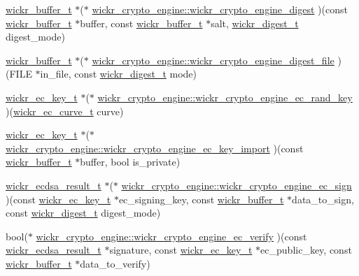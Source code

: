\begin{DoxyCompactItemize}
\item 
\hyperlink{structwickr__buffer}{wickr\+\_\+buffer\+\_\+t} $\ast$($\ast$ \hyperlink{group__wickr__crypto__engine_ga42dfc5b4df166616d962ee4c792ceaf4}{wickr\+\_\+crypto\+\_\+engine\+::wickr\+\_\+crypto\+\_\+engine\+\_\+digest} )(const \hyperlink{structwickr__buffer}{wickr\+\_\+buffer\+\_\+t} $\ast$buffer, const \hyperlink{structwickr__buffer}{wickr\+\_\+buffer\+\_\+t} $\ast$salt, \hyperlink{structwickr__digest}{wickr\+\_\+digest\+\_\+t} digest\+\_\+mode)
\item 
\hyperlink{structwickr__buffer}{wickr\+\_\+buffer\+\_\+t} $\ast$($\ast$ \hyperlink{group__wickr__crypto__engine_ga298d2dea6722151c11e04458d3924823}{wickr\+\_\+crypto\+\_\+engine\+::wickr\+\_\+crypto\+\_\+engine\+\_\+digest\+\_\+file} )(F\+I\+LE $\ast$in\+\_\+file, const \hyperlink{structwickr__digest}{wickr\+\_\+digest\+\_\+t} mode)
\item 
\hyperlink{structwickr__ec__key}{wickr\+\_\+ec\+\_\+key\+\_\+t} $\ast$($\ast$ \hyperlink{group__wickr__crypto__engine_gad16b229b7d16cf00d3983c277ee3b88b}{wickr\+\_\+crypto\+\_\+engine\+::wickr\+\_\+crypto\+\_\+engine\+\_\+ec\+\_\+rand\+\_\+key} )(\hyperlink{structwickr__ec__curve}{wickr\+\_\+ec\+\_\+curve\+\_\+t} curve)
\item 
\hyperlink{structwickr__ec__key}{wickr\+\_\+ec\+\_\+key\+\_\+t} $\ast$($\ast$ \hyperlink{group__wickr__crypto__engine_ga87a069bbd3cdf509946e4ca0ca008f8f}{wickr\+\_\+crypto\+\_\+engine\+::wickr\+\_\+crypto\+\_\+engine\+\_\+ec\+\_\+key\+\_\+import} )(const \hyperlink{structwickr__buffer}{wickr\+\_\+buffer\+\_\+t} $\ast$buffer, bool is\+\_\+private)
\item 
\hyperlink{structwickr__ecdsa__result}{wickr\+\_\+ecdsa\+\_\+result\+\_\+t} $\ast$($\ast$ \hyperlink{group__wickr__crypto__engine_gac5a36d2a53e06a75a2b818e6a5cc96a1}{wickr\+\_\+crypto\+\_\+engine\+::wickr\+\_\+crypto\+\_\+engine\+\_\+ec\+\_\+sign} )(const \hyperlink{structwickr__ec__key}{wickr\+\_\+ec\+\_\+key\+\_\+t} $\ast$ec\+\_\+signing\+\_\+key, const \hyperlink{structwickr__buffer}{wickr\+\_\+buffer\+\_\+t} $\ast$data\+\_\+to\+\_\+sign, const \hyperlink{structwickr__digest}{wickr\+\_\+digest\+\_\+t} digest\+\_\+mode)
\item 
bool($\ast$ \hyperlink{group__wickr__crypto__engine_gae541acc6433f6f5ffe84382ccd5e4f97}{wickr\+\_\+crypto\+\_\+engine\+::wickr\+\_\+crypto\+\_\+engine\+\_\+ec\+\_\+verify} )(const \hyperlink{structwickr__ecdsa__result}{wickr\+\_\+ecdsa\+\_\+result\+\_\+t} $\ast$signature, const \hyperlink{structwickr__ec__key}{wickr\+\_\+ec\+\_\+key\+\_\+t} $\ast$ec\+\_\+public\+\_\+key, const \hyperlink{structwickr__buffer}{wickr\+\_\+buffer\+\_\+t} $\ast$data\+\_\+to\+\_\+verify)

\end{DoxyCompactItemize}
